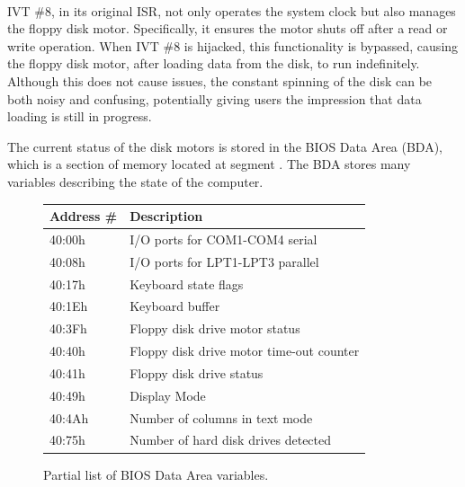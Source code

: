 \documentclass[book.tex]{subfiles}
\begin{document}
\par
\begin{minipage}{\textwidth}

\end{minipage}\\

\par
IVT \#8, in its original ISR, not only operates the system clock but also manages the floppy disk motor. Specifically, it ensures the motor shuts off after a read or write operation. When IVT \#8 is hijacked, this functionality is bypassed, causing the floppy disk motor, after loading data from the disk, to run indefinitely. Although this does not cause issues, the constant spinning of the disk can be both noisy and confusing, potentially giving users the impression that data loading is still in progress.\\

\par
The current status of the disk motors is stored in the BIOS Data Area (BDA), which is a section of memory located at segment . The BDA stores many variables describing the state of the computer.\\

\begin{figure}[H]
	\renewcommand{\arraystretch}{1.2}
	\centering
	\begin{tabularx}{\textwidth}{ l p{}  }
	  \toprule
	  \textbf{Address \#} & \textbf{Description} \\ \bottomrule
40:00h	&	I/O ports for COM1-COM4 serial \\
40:08h	&	I/O ports for LPT1-LPT3 parallel \\
40:17h	&	Keyboard state flags \\
40:1Eh	&	Keyboard buffer \\
40:3Fh	&	Floppy disk drive motor status \\
40:40h	&	Floppy disk drive motor time-out counter \\
40:41h	&	Floppy disk drive status \\
40:49h & 	Display Mode \\
40:4Ah & 	Number of columns in text mode \\
40:75h & 	Number of hard disk drives detected \\
		\bottomrule
	\end{tabularx}
	\caption{Partial list of BIOS Data Area variables\protect\footnotemark.}
\end{figure}
\end{document}
